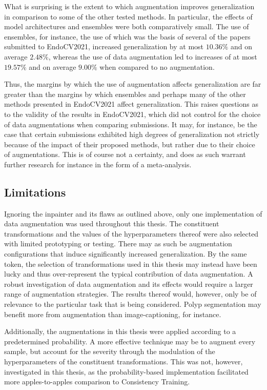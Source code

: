 What is surprising is the extent to which augmentation improves generalization in comparison to some of the other tested methods. In particular, the effects of model architectures and ensembles were both comparatively small. The use of ensembles, for instance, the use of which was the basis of several of the papers submitted to EndoCV2021, increased generalization by at most \(10.36\%\) and on average \(2.48\%\), whereas the use of data augmentation led to increases of at most \(19.57 \%\) and on average \(9.00\%\) when compared to no augmentation.

Thus, the margins by which the use of augmentation affects generalization are far greater than the margins by which ensembles and perhaps many of the other methods presented in EndoCV2021 affect generalization. This raises questions as to the validity of the results in EndoCV2021, which did not control for the choice of data augmentations when comparing submissions. It may, for instance, be the case that certain submissions exhibited high degrees of generalization not strictly because of the impact of their proposed methods, but rather due to their choice of augmentations. This is of course not a certainty, and does as such warrant further research for instance in the form of a meta-analysis. 

\subsection{Limitations} \label{augmentation_limitations}
    Ignoring the inpainter and its flaws as outlined above, only one implementation of data augmentation was used throughout this thesis. The constituent transformations and the values of the hyperparameters thereof were also selected with limited prototyping or testing. There may as such be augmentation configurations that induce significantly increased generalization. By the same token, the selection of transformations used in this thesis may instead have been lucky and thus over-represent the typical contribution of data augmentation. A robust investigation of data augmentation and its effects would require a larger range of augmentation strategies. The results thereof would, however, only be of relevance to the particular task that is being considered. Polyp segmentation may benefit more from augmentation than image-captioning, for instance. 
    
    Additionally, the augmentations in this thesis were applied according to a predetermined probability. A more effective technique may be to augment every sample, but account for the severity through the modulation of the hyperparameters of the constituent transformations. This was not, however, investigated in this thesis, as the probability-based implementation facilitated more apples-to-apples comparison to Consistency Training. 

